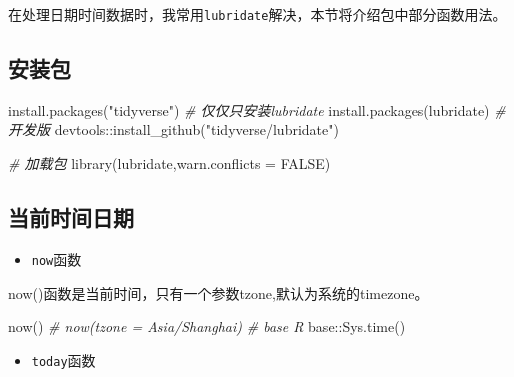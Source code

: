 \documentclass[
]{book}
\newenvironment{Shaded}{\begin{snugshade}}{\end{snugshade}}
\newcommand{\AttributeTok}[1]{\textcolor[rgb]{0.77,0.63,0.00}{#1}}
\newcommand{\CommentTok}[1]{\textcolor[rgb]{0.56,0.35,0.01}{\textit{#1}}}
\newcommand{\ConstantTok}[1]{\textcolor[rgb]{0.00,0.00,0.00}{#1}}
\newcommand{\FunctionTok}[1]{\textcolor[rgb]{0.00,0.00,0.00}{#1}}
\newcommand{\NormalTok}[1]{#1}
\newcommand{\SpecialCharTok}[1]{\textcolor[rgb]{0.00,0.00,0.00}{#1}}
\newcommand{\StringTok}[1]{\textcolor[rgb]{0.31,0.60,0.02}{#1}}
\providecommand{\tightlist}{%
  \setlength{\itemsep}{0pt}\setlength{\parskip}{0pt}}
\begin{document}
在处理日期时间数据时，我常用\texttt{lubridate}解决，本节将介绍包中部分函数用法。

\hypertarget{lubridate:install}{%
\subsection{安装包}\label{lubridate:install}}

\begin{Shaded}
\begin{Highlighting}[]
\FunctionTok{install.packages}\NormalTok{(}\StringTok{"tidyverse"}\NormalTok{)}
\CommentTok{\# 仅仅只安装lubridate}
\FunctionTok{install.packages}\NormalTok{(}\StringTok{\textquotesingle{}lubridate\textquotesingle{}}\NormalTok{)}
\CommentTok{\# 开发版}
\NormalTok{devtools}\SpecialCharTok{::}\FunctionTok{install\_github}\NormalTok{(}\StringTok{"tidyverse/lubridate"}\NormalTok{)}
\end{Highlighting}
\end{Shaded}

\begin{Shaded}
\begin{Highlighting}[]
\CommentTok{\# 加载包}
\FunctionTok{library}\NormalTok{(lubridate,}\AttributeTok{warn.conflicts =} \ConstantTok{FALSE}\NormalTok{)}
\end{Highlighting}
\end{Shaded}

\hypertarget{lubridate:current-datetime}{%
\subsection{当前时间日期}\label{lubridate:current-datetime}}

\begin{itemize}
\tightlist
\item
  \texttt{now}函数
\end{itemize}

now()函数是当前时间，只有一个参数tzone,默认为系统的timezone。

\begin{Shaded}
\begin{Highlighting}[]
\FunctionTok{now}\NormalTok{()}
\CommentTok{\# now(tzone = \textquotesingle{}Asia/Shanghai\textquotesingle{})}
\CommentTok{\# base R}
\NormalTok{base}\SpecialCharTok{::}\FunctionTok{Sys.time}\NormalTok{()}
\end{Highlighting}
\end{Shaded}

\begin{itemize}
\tightlist
\item
  \texttt{today}函数
\end{itemize}
\end{document}
